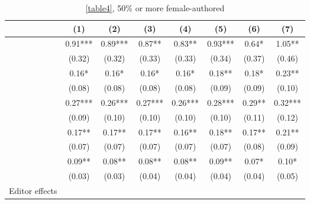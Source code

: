 \begin{table}[H]
    \footnotesize
    \centering
    \begin{threeparttable}
        \caption{\autoref{table4}, 50\% or more female-authored}
        \label{tableC4c}
        \begin{tabular}{p{2.64cm}S@{}S@{}S@{}S@{}S@{}S@{}S@{}}
            \toprule
            &{(1)}&{(2)}&{(3)}&{(4)}&{(5)}&{(6)}&{(7)}\\
            \midrule
            &        0.91***&        0.89***&        0.87** &        0.83** &        0.93***&        0.64*  &        1.05** \\
                                          &      (0.32)   &      (0.32)   &      (0.33)   &      (0.33)   &      (0.34)   &      (0.37)   &      (0.46)   \\
                &        0.16*  &        0.16*  &        0.16*  &        0.16*  &        0.18** &        0.18*  &        0.23** \\
                                          &      (0.08)   &      (0.08)   &      (0.08)   &      (0.08)   &      (0.09)   &      (0.09)   &      (0.10)   \\
                   &        0.27***&        0.26***&        0.27***&        0.26***&        0.28***&        0.29** &        0.32***\\
                                          &      (0.09)   &      (0.10)   &      (0.10)   &      (0.10)   &      (0.10)   &      (0.11)   &      (0.12)   \\
                          &        0.17** &        0.17** &        0.17** &        0.16** &        0.18** &        0.17** &        0.21** \\
                                          &      (0.07)   &      (0.07)   &      (0.07)   &      (0.07)   &      (0.07)   &      (0.08)   &      (0.09)   \\
                    &        0.09** &        0.08** &        0.08** &        0.08** &        0.09** &        0.07*  &        0.10*  \\
                                          &      (0.03)   &      (0.03)   &      (0.04)   &      (0.04)   &      (0.04)   &      (0.04)   &      (0.05)   \\
            \midrule
            Editor effects                &           {}   &           {}   &           {}   &           {}   &           {}   &           {}   &           {}   \\

\end{tabular}
\end{threeparttable}
\end{table}
